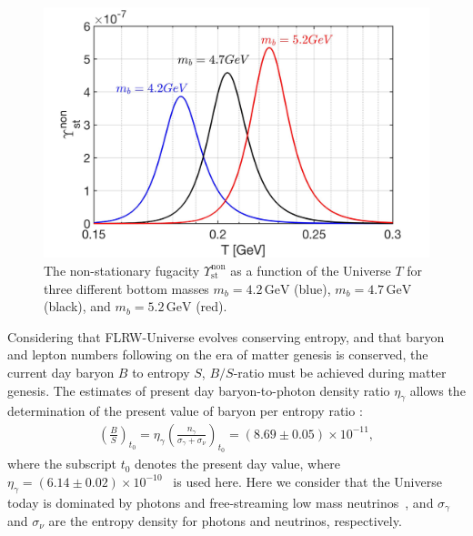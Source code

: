 \begin{figure}
\centerline{\includegraphics[width=0.9\linewidth]{./plots/NonstationaryFugacity}}
\caption{The non-stationary fugacity $\Upsilon_\mathrm{st}^{\mathrm{non}}$ as a function of the Universe $T$ for three different bottom masses $m_b=4.2\,\mathrm{GeV}$ (blue), $m_b=4.7\,\mathrm{GeV}$ (black), and $m_b=5.2\,\mathrm{GeV}$ (red). }
\label{NonFugacity}
\end{figure}
 

 Considering that FLRW-Universe evolves conserving entropy, and that baryon and lepton numbers following on the era of matter genesis is conserved, the current day baryon $B$ to entropy $S$, $B/S$-ratio must be achieved during matter genesis. The estimates of present day baryon-to-photon density ratio $\eta_\gamma$ allows the determination of the present value of baryon per entropy ratio \cite{Fromerth:2012fe,Rafelski:2019twp,Letessier:2002ony,Fromerth:2002wb}:
\begin{align}
\left(\frac{B}{S}\right)_{t_0}\!\!\!\!=\eta_\gamma\left(\frac{n_\gamma}{\sigma_\gamma+\sigma_\nu}\right)_{\!t_0}\!\!\!\!=(8.69\pm0.05)\!\!\times\!\!10^{-11},
\end{align}
where the subscript $t_0$ denotes the present day value, where $\eta_\gamma=(6.14\pm0.02)\times10^{-10}$~\cite{ParticleDataGroup:2022pth}  is used here. Here we consider that the Universe today is dominated by photons and free-streaming  low mass neutrinos~\cite{Birrell:2012gg}, and $\sigma_\gamma$ and $\sigma_\nu$ are the entropy density for photons and neutrinos, respectively. 
 
